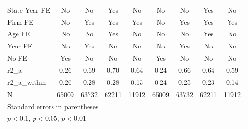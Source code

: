 {\begin{tabular}{l*{8}{c}}
\addlinespace
State-Year FE       &          No         &          No         &         Yes         &          No         &          No         &          No         &         Yes         &          No         \\
\addlinespace
Firm FE             &          No         &         Yes         &         Yes         &         Yes         &          No         &         Yes         &         Yes         &         Yes         \\
\addlinespace
Age FE              &          No         &          No         &         Yes         &          No         &          No         &          No         &         Yes         &          No         \\
\addlinespace
Year FE             &          No         &         Yes         &          No         &          No         &          No         &         Yes         &          No         &          No         \\
\addlinespace
No FE               &         Yes         &          No         &          No         &          No         &         Yes         &          No         &          No         &          No         \\
\midrule
r2\_a                &        0.26         &        0.69         &        0.70         &        0.64         &        0.24         &        0.66         &        0.64         &        0.59         \\
r2\_a\_within         &        0.26         &        0.28         &        0.28         &        0.13         &        0.24         &        0.25         &        0.23         &        0.14         \\
N                   &       65009         &       63732         &       62211         &       11912         &       65009         &       63732         &       62211         &       11912         \\
\bottomrule
\multicolumn{9}{l}{\footnotesize Standard errors in parentheses}\\
\multicolumn{9}{l}{\footnotesize \sym{*} \(p<0.1\), \sym{**} \(p<0.05\), \sym{***} \(p<0.01\)}\\
\end{tabular}
}

